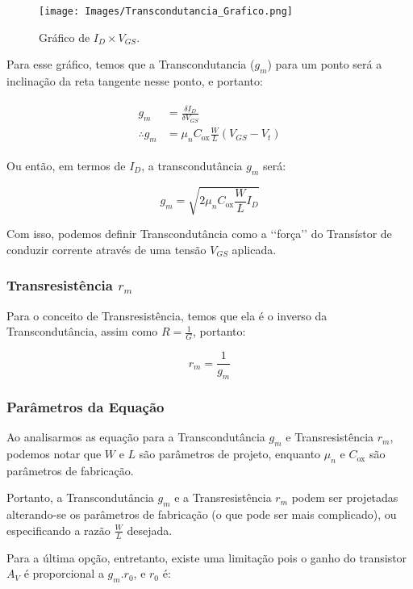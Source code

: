 \documentclass[12pt]{article}
\begin{document}
\begin{figure}[H]
  \begin{center}
    \texttt{[image: Images/Transcondutancia\_Grafico.png]}
  \end{center}
  \caption{Gráfico de $I_D \times V_{GS}$.}
\end{figure}

Para esse gráfico, temos que a Transcondutancia ($g_m$) para um ponto será a inclinação da reta tangente nesse ponto, e portanto:

\begin{align*}
  \begin{split}
    g_m &= \frac{\delta I_D}{\delta V_{GS}} \\[0.7cm]
    \therefore g_m &= \mu_n C_{\text{ox}} \frac{W}{L} (V_{GS} - V_t)
  \end{split}
\end{align*}

Ou então, em termos de $I_D$, a transcondutância $g_m$ será:

$$
  g_m = \sqrt{2 \mu_n C_{\text{ox}} \frac{W}{L} I_D}
$$

Com isso, podemos definir Transcondutância como a ‘‘força’’ do Transístor de conduzir corrente através de uma tensão $V_{GS}$ aplicada.

\subsubsection{Transresistência $r_m$}

Para o conceito de Transresistência, temos que ela é o inverso da Transcondutância, assim como $R = \frac{1}{G}$, portanto:

$$
  r_m = \frac{1}{g_m}
$$

\subsubsection{Parâmetros da Equação}

Ao analisarmos as equação para a Transcondutância $g_m$ e Transresistência $r_m$, podemos notar que $W$ e $L$ são parâmetros de projeto, enquanto $\mu_n$ e $C_{\text{ox}}$ são parâmetros de fabricação.

Portanto, a Transcondutância $g_m$ e a Transresistência $r_m$ podem ser projetadas alterando-se os parâmetros de fabricação (o que pode ser mais complicado), ou especificando a razão $\frac{W}{L}$ desejada.

Para a última opção, entretanto, existe uma limitação pois o ganho do transistor $A_V$ é proporcional a $g_m . r_0$, e $r_0$ é:
\end{document}
